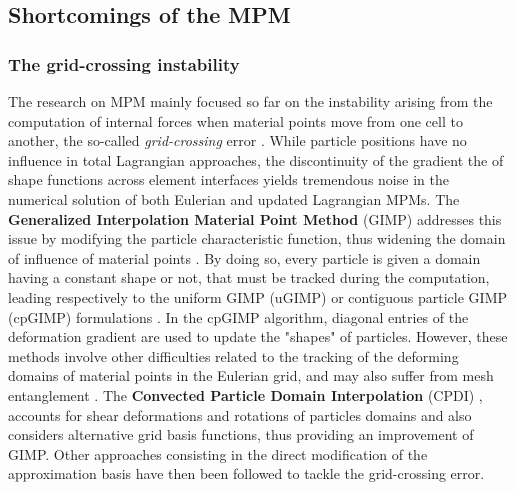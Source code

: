 \subsection{Shortcomings of the MPM}
\subsubsection*{The grid-crossing instability}
The research on MPM mainly focused so far on the instability arising from the computation of internal forces when material points move from one cell to another, the so-called \textit{grid-crossing} error \cite{Gimp}.
While particle positions have no influence in total Lagrangian approaches, the discontinuity of the gradient the of shape functions across element interfaces yields tremendous noise in the numerical solution of both Eulerian and updated Lagrangian MPMs. 
The \textbf{Generalized Interpolation Material Point Method} (GIMP) addresses this issue by modifying the particle characteristic function, thus widening the domain of influence of material points \cite{Gimp}.
By doing so, every particle is given a domain having a constant shape or not, that must be tracked during the computation, leading respectively to the uniform GIMP (uGIMP) or contiguous particle GIMP (cpGIMP) formulations \cite{Book_MPM}.
In the cpGIMP algorithm, diagonal entries of the deformation gradient are used to update the "shapes" of particles.
However, these methods involve other difficulties related to the tracking of the deforming domains of material points in the Eulerian grid, and may also suffer from mesh entanglement \cite{DDMPM0}.
The \textbf{Convected Particle Domain Interpolation} (CPDI) \cite{CPDI}, accounts for shear deformations and rotations of particles domains and also considers alternative grid basis functions, thus providing an improvement of GIMP.
Other approaches consisting in the direct modification of the approximation basis have then been followed to tackle the grid-crossing error.
